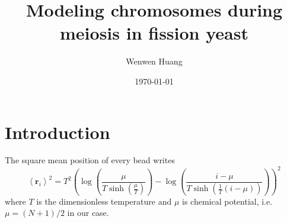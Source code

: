\documentclass{article}
\begin{document}
\title{Modeling chromosomes during meiosis in fission yeast}
\author{Wenwen Huang}
\date{\today}

\maketitle

\section{Introduction}
\label{sec:introduction}

The square mean position of every bead writes
\begin{equation}
	\left<\mathbf{r}_i\right>^2  = 
T^{2} \left(\log{\left (\frac{\mu}{T \sinh{\left (\frac{\mu}{T} \right )}} \right )} - \log{\left (\frac{i - \mu}{T \sinh{\left (\frac{1}{T} \left(i - \mu\right) \right )}} \right )}\right)^{2}
\end{equation}
where $T$ is the dimensionless temperature and $\mu$ is chemical potential, i.e. $\mu = (N+1)/2$ in our case.
\end{document}
